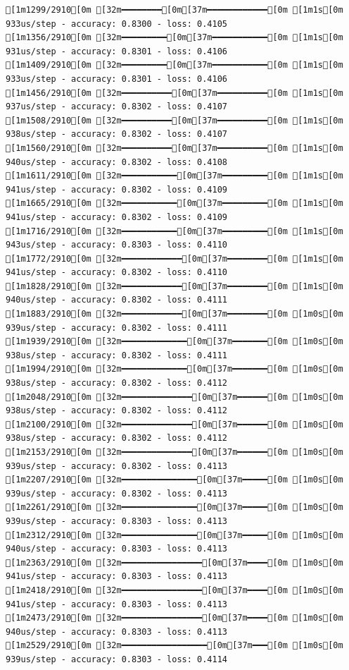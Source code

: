 \documentclass[
  letterpaper,
  DIV=11,
  numbers=noendperiod]{scrartcl}
\begin{document}
\begin{verbatim}
[1m1299/2910[0m [32m━━━━━━━━[0m[37m━━━━━━━━━━━━[0m [1m1s[0m 933us/step - accuracy: 0.8300 - loss: 0.4105
[1m1356/2910[0m [32m━━━━━━━━━[0m[37m━━━━━━━━━━━[0m [1m1s[0m 931us/step - accuracy: 0.8301 - loss: 0.4106
[1m1409/2910[0m [32m━━━━━━━━━[0m[37m━━━━━━━━━━━[0m [1m1s[0m 933us/step - accuracy: 0.8301 - loss: 0.4106
[1m1456/2910[0m [32m━━━━━━━━━━[0m[37m━━━━━━━━━━[0m [1m1s[0m 937us/step - accuracy: 0.8302 - loss: 0.4107
[1m1508/2910[0m [32m━━━━━━━━━━[0m[37m━━━━━━━━━━[0m [1m1s[0m 938us/step - accuracy: 0.8302 - loss: 0.4107
[1m1560/2910[0m [32m━━━━━━━━━━[0m[37m━━━━━━━━━━[0m [1m1s[0m 940us/step - accuracy: 0.8302 - loss: 0.4108
[1m1611/2910[0m [32m━━━━━━━━━━━[0m[37m━━━━━━━━━[0m [1m1s[0m 941us/step - accuracy: 0.8302 - loss: 0.4109
[1m1665/2910[0m [32m━━━━━━━━━━━[0m[37m━━━━━━━━━[0m [1m1s[0m 941us/step - accuracy: 0.8302 - loss: 0.4109
[1m1716/2910[0m [32m━━━━━━━━━━━[0m[37m━━━━━━━━━[0m [1m1s[0m 943us/step - accuracy: 0.8303 - loss: 0.4110
[1m1772/2910[0m [32m━━━━━━━━━━━━[0m[37m━━━━━━━━[0m [1m1s[0m 941us/step - accuracy: 0.8302 - loss: 0.4110
[1m1828/2910[0m [32m━━━━━━━━━━━━[0m[37m━━━━━━━━[0m [1m1s[0m 940us/step - accuracy: 0.8302 - loss: 0.4111
[1m1883/2910[0m [32m━━━━━━━━━━━━[0m[37m━━━━━━━━[0m [1m0s[0m 939us/step - accuracy: 0.8302 - loss: 0.4111
[1m1939/2910[0m [32m━━━━━━━━━━━━━[0m[37m━━━━━━━[0m [1m0s[0m 938us/step - accuracy: 0.8302 - loss: 0.4111
[1m1994/2910[0m [32m━━━━━━━━━━━━━[0m[37m━━━━━━━[0m [1m0s[0m 938us/step - accuracy: 0.8302 - loss: 0.4112
[1m2048/2910[0m [32m━━━━━━━━━━━━━━[0m[37m━━━━━━[0m [1m0s[0m 938us/step - accuracy: 0.8302 - loss: 0.4112
[1m2100/2910[0m [32m━━━━━━━━━━━━━━[0m[37m━━━━━━[0m [1m0s[0m 938us/step - accuracy: 0.8302 - loss: 0.4112
[1m2153/2910[0m [32m━━━━━━━━━━━━━━[0m[37m━━━━━━[0m [1m0s[0m 939us/step - accuracy: 0.8302 - loss: 0.4113
[1m2207/2910[0m [32m━━━━━━━━━━━━━━━[0m[37m━━━━━[0m [1m0s[0m 939us/step - accuracy: 0.8302 - loss: 0.4113
[1m2261/2910[0m [32m━━━━━━━━━━━━━━━[0m[37m━━━━━[0m [1m0s[0m 939us/step - accuracy: 0.8303 - loss: 0.4113
[1m2312/2910[0m [32m━━━━━━━━━━━━━━━[0m[37m━━━━━[0m [1m0s[0m 940us/step - accuracy: 0.8303 - loss: 0.4113
[1m2363/2910[0m [32m━━━━━━━━━━━━━━━━[0m[37m━━━━[0m [1m0s[0m 941us/step - accuracy: 0.8303 - loss: 0.4113
[1m2418/2910[0m [32m━━━━━━━━━━━━━━━━[0m[37m━━━━[0m [1m0s[0m 941us/step - accuracy: 0.8303 - loss: 0.4113
[1m2473/2910[0m [32m━━━━━━━━━━━━━━━━[0m[37m━━━━[0m [1m0s[0m 940us/step - accuracy: 0.8303 - loss: 0.4113
[1m2529/2910[0m [32m━━━━━━━━━━━━━━━━━[0m[37m━━━[0m [1m0s[0m 939us/step - accuracy: 0.8303 - loss: 0.4114

\end{verbatim}
\end{document}
